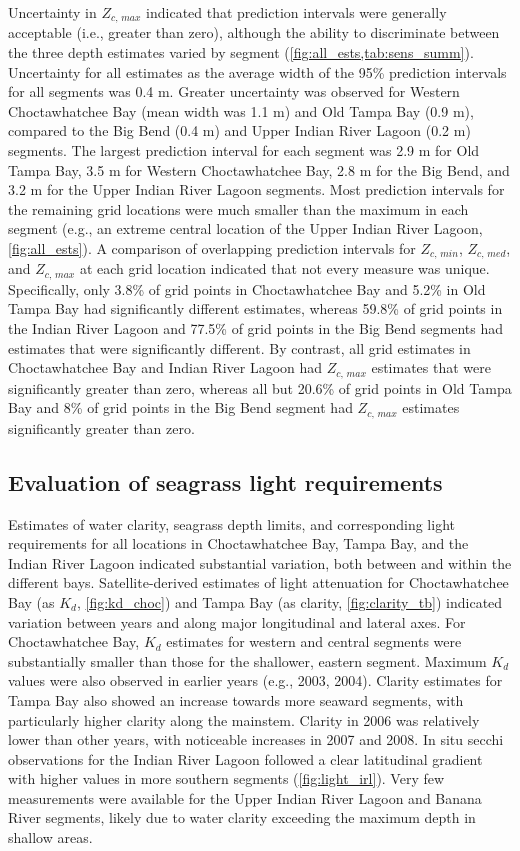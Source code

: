 \documentclass[letterpaper,12pt,oneside]{article}\usepackage[]{graphicx}\usepackage[]{color}
\begin{document}
Uncertainty in $Z_{c,\,max}$ indicated that prediction intervals were generally acceptable (i.e., greater than zero), although the ability to discriminate between the three depth estimates varied by segment (\cref{fig:all_ests,tab:sens_summ}). Uncertainty for all estimates as the average width of the 95\% prediction intervals for all segments was 0.4 m.  Greater uncertainty was observed for Western Choctawhatchee Bay (mean width was 1.1 m) and Old Tampa Bay (0.9 m), compared to the Big Bend (0.4 m) and Upper Indian River Lagoon (0.2 m) segments.  The largest prediction interval for each segment was 2.9 m for Old Tampa Bay, 3.5 m for Western Choctawhatchee Bay, 2.8 m for the Big Bend, and 3.2 m for the Upper Indian River Lagoon segments.  Most prediction intervals for the remaining grid locations were much smaller than the maximum in each segment (e.g., an extreme central location of the Upper Indian River Lagoon, \cref{fig:all_ests}).  A comparison of overlapping prediction intervals for $Z_{c,\,min}$, $Z_{c,\,med}$, and $Z_{c,\,max}$ at each grid location indicated that not every measure was unique.  Specifically, only 3.8\% of grid points in Choctawhatchee Bay and 5.2\% in Old Tampa Bay had significantly different estimates, whereas 59.8\% of grid points in the Indian River Lagoon and 77.5\% of grid points in the Big Bend segments had estimates that were significantly different.  By contrast, all grid estimates in Choctawhatchee Bay and Indian River Lagoon had $Z_{c,\,max}$ estimates that were significantly greater than zero, whereas all but 20.6\% of grid points in Old Tampa Bay and 8\% of grid points in the Big Bend segment had $Z_{c,\,max}$ estimates significantly greater than zero. 

\subsection{Evaluation of seagrass light requirements}

Estimates of water clarity, seagrass depth limits, and corresponding light requirements for all locations in Choctawhatchee Bay, Tampa Bay, and the Indian River Lagoon indicated substantial variation, both between and within the different bays.  Satellite-derived estimates of light attenuation for Choctawhatchee Bay (as $K_d$, \cref{fig:kd_choc}) and Tampa Bay (as clarity, \cref{fig:clarity_tb}) indicated variation between years and along major longitudinal and lateral axes.  For Choctawhatchee Bay, $K_d$ estimates for western and central segments were substantially smaller than those for the shallower, eastern segment.  Maximum $K_d$ values were also observed in earlier years (e.g., 2003, 2004).  Clarity estimates for Tampa Bay also showed an increase towards more seaward segments, with particularly higher clarity along the mainstem.  Clarity in 2006 was relatively lower than other years, with noticeable increases in 2007 and 2008.  In situ secchi observations for the Indian River Lagoon followed a clear latitudinal gradient with higher values in more southern segments (\cref{fig:light_irl}).  Very few measurements were available for the Upper Indian River Lagoon and Banana River segments, likely due to water clarity exceeding the maximum depth in shallow areas.
\end{document}
